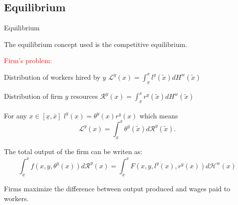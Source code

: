 \documentclass[notes,11pt, aspectratio=169]{beamer}
\newenvironment{wideitemize}{\itemize\addtolength{\itemsep}{10pt}}{\enditemize}
\begin{document}
\subsection{Equilibrium}
\begin{frame}{Equilibrium}
	\begin{wideitemize}
		\item The equilibrium concept used is the competitive equilibrium.
		\pause
		\item \textcolor{red}{Firm's problem:}
		\begin{wideitemize}
			\item  Distribution of workers hired by $y$ $\mathcal{L}^y(x) = \int_{\underline{x}}^xl^y(\tilde{x})dH^w(\tilde{x})$ 
			\item  Distribution of firm $y$ resources $\mathcal{R}^y(x) = \int_{\underline{x}}^xr^y(\tilde{x})dH^w(\tilde{x})$
			\pause
			\item  For any $x\in[\underline{x}, \bar{x}]$ $l^y(x) = \theta^y(x)r^y(x)$ which means 
			\begin{equation*}\label{labor_demand}
			\mathcal{L}^y(x) = \int_{\underline{x}}^x\theta^y(\tilde{x})d\mathcal{R}^y(\tilde{x}).
			\end{equation*}
			\pause
			\item The total output of the firm can be writen as:
			\[\int_{\underline{x}}^{\overline{x}} f\left(x, y, \theta^{y}(x)\right) d \mathcal{R}^{y}(x) = \int_{\underline{x}}^{\overline{x}} F\left(x, y, l^y(x), r^y(x)\right) d \mathcal{H}^{w}(x)\]
			\item  Firms maximize the difference between output produced and wages paid to workers.  
		\end{wideitemize}
	\end{wideitemize}
\end{frame}
\end{document}
